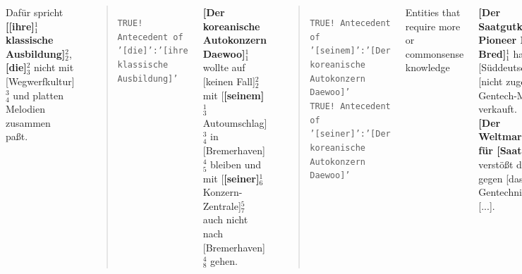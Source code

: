 \documentclass[25pt, a0paper, portrait, margin=10mm, innermargin=15mm,
blockverticalspace=15mm, colspace=15mm, subcolspace=8mm]{tikzposter}
\begin{document}
\begin{columns}
{
{Dafür spricht \textbf{[[ihre]$^{1}_{1}$ klassische  Ausbildung]}$^{2}_{2}$,  \textbf{[die]}$^{2}_{3}$ nicht mit [Wegwerfkultur]$^{3}_{4}$ und platten Melodien zusammen paßt.
\begin{quote}
\texttt{TRUE! Antecedent of '[die]':'[ihre klassische Ausbildung]'}
\end{quote}}

{\textbf{[Der koreanische Autokonzern Daewoo]}$^{1}_{1}$ wollte auf [keinen Fall]$^{2}_{2}$ mit [\textbf{[seinem]}$^{1}_{3}$ Autoumschlag]$^{3}_{4}$ in [Bremerhaven]$^{4}_{5}$ bleiben und mit [\textbf{[seiner]}$^{1}_{6}$ Konzern-Zentrale]$^{5}_{7}$ auch nicht nach [Bremerhaven]$^{4}_{8}$ gehen.
\begin{quote}
\texttt{TRUE! Antecedent of '[seinem]':'[Der koreanische Autokonzern Daewoo]' \\
TRUE! Antecedent of '[seiner]':'[Der koreanische Autokonzern Daewoo]'}
\end{quote}}




\innerblock
{Entities that require more or commonsense knowledge}
{\textbf{[Der Saatgutkonzern Pioneer Hi-Bred]}$^{1}_{1}$ hat in [Süddeutschland]$^{2}_{2}$ [nicht zugelassenen Gentech-Mais]$^{3}_{3}$ verkauft.\\\textbf{[Der Weltmarktführer für [Saatgut]$^{4}_{4}$]}$^{1}_{5}$ verstößt damit gegen [das Gentechnikgesetz]$^{5}_{6}$, [...].
\begin{quote}
\texttt{FALSE! No Antecedent for '[Der Weltmarktführer für Saatgut]'\\ANTECEDENT: [Der Saatgutkonzern Pioneer]}
\end{quote}}
} 


%



\end{columns}
\end{document}
